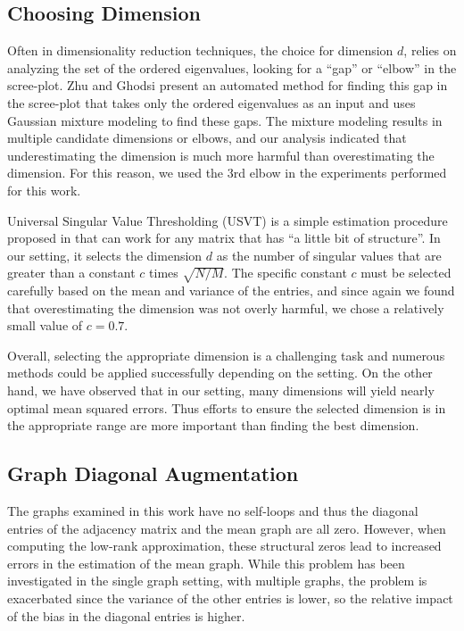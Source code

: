 \documentclass[10pt,letterpaper]{article}
\begin{document}
\subsection{Choosing Dimension}
\label{section:dim_select}
Often in dimensionality reduction techniques, the choice for dimension $d$, relies on analyzing the set of the ordered eigenvalues, looking for a ``gap'' or ``elbow'' in the scree-plot. Zhu and Ghodsi \cite{zhu2006automatic} present an automated method for finding this gap in the scree-plot that takes only the ordered eigenvalues as an input and uses Gaussian mixture modeling to find these gaps.
The mixture modeling results in multiple candidate dimensions or elbows, and our analysis indicated that underestimating the dimension is much more harmful than overestimating the dimension.
For this reason, we used the 3rd elbow in the experiments performed for this work.

Universal Singular Value Thresholding (USVT) is a simple estimation procedure proposed in \cite{chatterjee2015matrix} that can work for any matrix that has ``a little bit of structure''. 
In our setting, it selects the dimension $d$ as the number of singular values that are greater than a constant $c$ times $\sqrt{N/M}$.
The specific constant $c$ must be selected carefully based on the mean and variance of the entries, and since again we found that overestimating the dimension was not overly harmful, we chose a relatively small value of $c=0.7$.

Overall, selecting the appropriate dimension is a challenging task and numerous methods could be applied successfully depending on the setting.
On the other hand, we have observed that in our setting, many dimensions will yield nearly optimal mean squared errors. 
Thus efforts to ensure the selected dimension is in the appropriate range are more important than finding the best dimension.



\subsection{Graph Diagonal Augmentation}
\label{section:diag_aug}
The graphs examined in this work have no self-loops and thus the diagonal entries of the adjacency matrix and the mean graph are all zero.
However, when computing the low-rank approximation, these structural zeros lead to increased errors in the estimation of the mean graph. 
While this problem has been investigated in the single graph setting, with multiple graphs, the problem is exacerbated since the variance of the other entries is lower, so the relative impact of the bias in the diagonal entries is higher.
\end{document}

